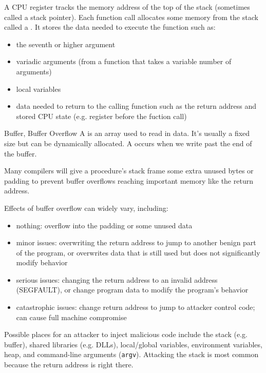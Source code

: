 A CPU register tracks the memory address of the top of the stack (sometimes called a stack pointer). Each function call allocates some memory from the stack called a . It stores the data needed to execute the function such as:
\begin{itemize}
    \item the seventh or higher argument
    \item variadic arguments (from a function that takes a variable number of arguments)
    \item local variables
    \item data needed to return to the calling function such as the return address and stored CPU state (e.g. register before the fuction call)
\end{itemize}

\begin{dfnbox}{Buffer, Buffer Overflow}{}
    A  is an array used to read in data. It's usually a fixed size but can be dynamically allocated. A  occurs when we write past the end of the buffer.
\end{dfnbox}

\begin{notebox}
    Many compilers will give a procedure's stack frame some extra unused bytes or padding to prevent buffer overflows reaching important memory like the return address.
\end{notebox}

Effects of buffer overflow can widely vary, including:
\begin{itemize}
    \item nothing: overflow into the padding or some unused data
    \item minor issues: overwriting the return address to jump to another benign part of the program, or overwrites data that is still used but does not significantly modify behavior
    \item serious issues: changing the return address to an invalid address (SEGFAULT), or change program data to modify the program's behavior
    \item catastrophic issues: change return address to jump to attacker control code; can cause full machine compromise
\end{itemize}

Possible places for an attacker to inject malicious code include the stack (e.g. buffer), shared libraries (e.g. DLLs), local/global variables, environment variables, heap, and command-line arguments (\texttt{argv}). Attacking the stack is most common because the return address is right there.

